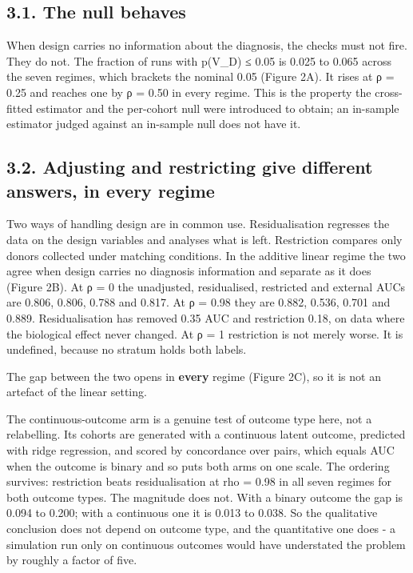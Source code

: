 \subsection{3.1. The null behaves}\label{the-null-behaves}

When design carries no information about the diagnosis, the checks must not fire. They do not. The fraction of runs with p(V\_D) ≤ 0.05 is 0.025 to 0.065 across the seven regimes, which brackets the nominal 0.05 (Figure 2A). It rises at ρ = 0.25 and reaches one by ρ = 0.50 in every regime. This is the property the cross-fitted estimator and the per-cohort null were introduced to obtain; an in-sample estimator judged against an in-sample null does not have it.

\subsection{3.2. Adjusting and restricting give different answers, in every regime}\label{adjusting-and-restricting-give-different-answers-in-every-regime}

Two ways of handling design are in common use. Residualisation regresses the data on the design variables and analyses what is left. Restriction compares only donors collected under matching conditions. In the additive linear regime the two agree when design carries no diagnosis information and separate as it does (Figure 2B). At ρ = 0 the unadjusted, residualised, restricted and external AUCs are 0.806, 0.806, 0.788 and 0.817. At ρ = 0.98 they are 0.882, 0.536, 0.701 and 0.889. Residualisation has removed 0.35 AUC and restriction 0.18, on data where the biological effect never changed. At ρ = 1 restriction is not merely worse. It is undefined, because no stratum holds both labels.

The gap between the two opens in \textbf{every} regime (Figure 2C), so it is not an artefact of the linear setting.

The continuous-outcome arm is a genuine test of outcome type here, not a relabelling. Its cohorts are generated with a continuous latent outcome, predicted with ridge regression, and scored by concordance over pairs, which equals AUC when the outcome is binary and so puts both arms on one scale. The ordering survives: restriction beats residualisation at rho = 0.98 in all seven regimes for both outcome types. The magnitude does not. With a binary outcome the gap is 0.094 to 0.200; with a continuous one it is 0.013 to 0.038. So the qualitative conclusion does not depend on outcome type, and the quantitative one does - a simulation run only on continuous outcomes would have understated the problem by roughly a factor of five.

